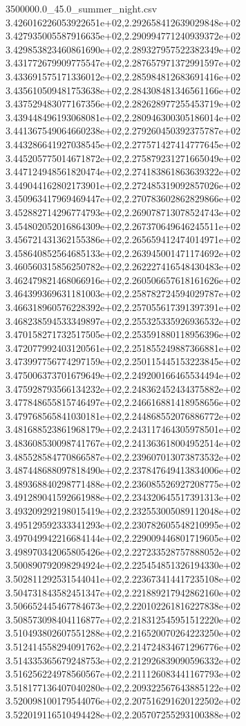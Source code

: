 \begin{filecontents*}{3500000.0_45.0_summer_night.csv}
3.426016226053922651e+02,2.292658412639029848e+02
3.427935005587916635e+02,2.290994771240939372e+02
3.429853823460861690e+02,2.289327957522382349e+02
3.431772679909775547e+02,2.287657971372991597e+02
3.433691575171336012e+02,2.285984812683691416e+02
3.435610509481753638e+02,2.284308481346561166e+02
3.437529483077167356e+02,2.282628977255453719e+02
3.439448496193068081e+02,2.280946300305186014e+02
3.441367549064660238e+02,2.279260450392375787e+02
3.443286641927038545e+02,2.277571427414777645e+02
3.445205775014671872e+02,2.275879231271665049e+02
3.447124948561820474e+02,2.274183861863639322e+02
3.449044162802173901e+02,2.272485319092857026e+02
3.450963417969469447e+02,2.270783602862829866e+02
3.452882714296774793e+02,2.269078713078524743e+02
3.454802052016864309e+02,2.267370649646245511e+02
3.456721431362155386e+02,2.265659412474014971e+02
3.458640852564685133e+02,2.263945001471174692e+02
3.460560315856250782e+02,2.262227416548430483e+02
3.462479821468066916e+02,2.260506657618161626e+02
3.464399369631181003e+02,2.258782724594029787e+02
3.466318960576228392e+02,2.257055617391397391e+02
3.468238594533349897e+02,2.255325335926936532e+02
3.470158271732517505e+02,2.253591880118956396e+02
3.472077992403120561e+02,2.251855249887366881e+02
3.473997756774297159e+02,2.250115445153223845e+02
3.475006373701679649e+02,2.249200166465534494e+02
3.475928793566134232e+02,2.248362452434375882e+02
3.477848655815746497e+02,2.246616881418958656e+02
3.479768565841030181e+02,2.244868552076886772e+02
3.481688523861968179e+02,2.243117464305978501e+02
3.483608530098741767e+02,2.241363618004952514e+02
3.485528584770866587e+02,2.239607013073873532e+02
3.487448688097818490e+02,2.237847649413834006e+02
3.489368840298771488e+02,2.236085526927208775e+02
3.491289041592661988e+02,2.234320645517391313e+02
3.493209292198015419e+02,2.232553005089112048e+02
3.495129592333341293e+02,2.230782605548210995e+02
3.497049942216684144e+02,2.229009446801719605e+02
3.498970342065805426e+02,2.227233528757888052e+02
3.500890792098294924e+02,2.225454851326194330e+02
3.502811292531544041e+02,2.223673414417235108e+02
3.504731843582451347e+02,2.221889217942862160e+02
3.506652445467784673e+02,2.220102261816227838e+02
3.508573098404116877e+02,2.218312545951512220e+02
3.510493802607551288e+02,2.216520070264223250e+02
3.512414558294091762e+02,2.214724834671296776e+02
3.514335365679248753e+02,2.212926839090596332e+02
3.516256224978560567e+02,2.211126083441167793e+02
3.518177136407040280e+02,2.209322567643885122e+02
3.520098100179544076e+02,2.207516291620122502e+02
3.522019116510494428e+02,2.205707255293100388e+02

\end{filecontents*}
